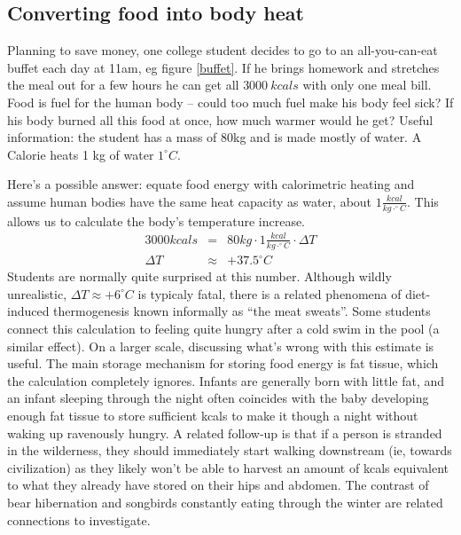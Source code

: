 \documentclass[12pt]{iopart}
\newcommand{\bea}{\begin{eqnarray}}
\newcommand{\eea}{\end{eqnarray}}
\newcommand{\degC}{^{\circ}C}
\begin{document}
\subsection{Converting food into body heat}
Planning to save money, one college student decides to go to an all-you-can-eat buffet each day at 11am, eg figure \ref{buffet}.  If he brings homework and stretches the meal out for a few hours he can get all $3000~kcals$ with only one meal bill.  Food is fuel for the human body -- could too much fuel make his body feel sick? If his body burned all this food at once, how much warmer would he get? 
Useful information: the student has a mass of 80kg and is made mostly of water.  A Calorie heats 1 kg of water $1^{\circ}C$. 

Here's a possible answer:
equate food energy with calorimetric heating and assume human bodies have the same heat capacity as water, about $1\frac{kcal}{kg\cdot\degC}$. This allows us to calculate the body's temperature increase.
\bea
3000kcals &=& 80kg\cdot1 \frac{kcal}{kg\cdot \degC}\cdot\Delta T\\
\Delta T &\approx& +37.5\degC
\eea
Students are normally quite surprised at this number.  Although wildly unrealistic, $\Delta T \approx +6\degC$ is typicaly fatal, there is a related phenomena of diet-induced thermogenesis\cite{meat_sweats} known informally as ``the meat sweats''. Some students connect this calculation to feeling quite hungry after a cold swim in the pool (a similar effect).  On a larger scale, discussing what's wrong with this estimate is useful.  The main storage mechanism for storing food energy is fat tissue, which the calculation completely ignores.  Infants are generally born with little fat, and an infant sleeping through the night often coincides with the baby developing enough fat tissue to store sufficient kcals to make it though a night without waking up ravenously hungry.  A related follow-up is that if a person is stranded in the wilderness, they should immediately start walking downstream (ie, towards civilization) as they likely won't be able to harvest an amount of kcals equivalent to what they already have stored on their hips and abdomen.\cite{trout}  The contrast of bear hibernation \cite{fat_bear} and songbirds constantly eating through the winter are related connections to investigate.
\end{document}
